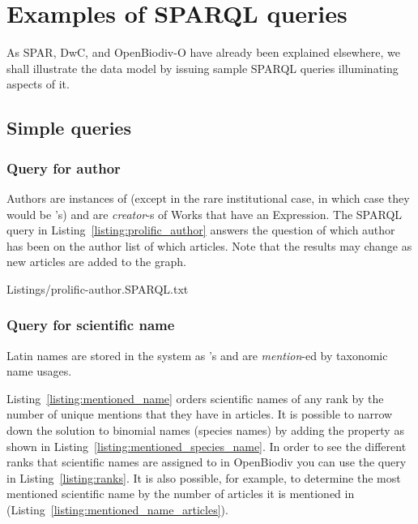\section{Examples of SPARQL queries}

As SPAR, DwC, and OpenBiodiv-O have already been explained elsewhere, we shall illustrate the data model by issuing sample SPARQL queries illuminating aspects of it.

\subsection{Simple queries}

\subsubsection{Query for author} Authors are instances of  (except in the rare institutional case, in which case they would be 's) and are \emph{creator}-s of Works that have an Expression. The SPARQL query in Listing~\ref{listing:prolific_author} answers the question of which author has been on the author list of which articles. Note that the results may change as new articles are added to the graph.


{Listings/prolific-author.SPARQL.txt}

\subsubsection{Query for scientific name}

Latin names are stored in the system as 's and are \emph{mention}-ed by taxonomic name usages.

Listing~\ref{listing:mentioned_name} orders scientific names of any rank by the number of unique mentions that they have in articles. It is possible to narrow down the solution to binomial names (species names) by adding the  property as shown in Listing~\ref{listing:mentioned_species_name}. In order to see the different ranks that scientific names are assigned to in OpenBiodiv you can use the query in Listing~\ref{listing:ranks}. It is also possible, for example, to determine the most mentioned scientific name by the number of articles it is mentioned in (Listing~\ref{listing:mentioned_name_articles}).



